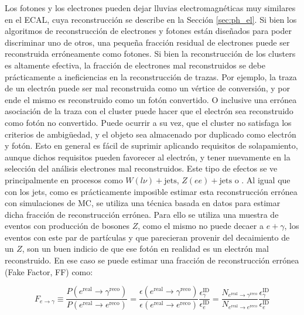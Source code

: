 Los fotones y los electrones pueden dejar lluvias electromagnéticas muy
similares en el ECAL, cuya reconstrucción se describe en la Sección \ref{sec:ph_el}.
Si bien los algoritmos de reconstrucción de electrones y fotones están diseñados para poder discriminar uno de otros, una pequeña fracción residual de electrones puede ser reconstruida erróneamente como fotones. Si bien la reconstrucción de los clusters es altamente efectiva, la fracción de electrones mal reconstruidos se debe prácticamente a ineficiencias en la reconstrucción de trazas. Por ejemplo, la traza de un electrón puede ser mal reconstruida como un vértice de conversión, y por ende el mismo es reconstruido como un fotón convertido. O inclusive una errónea asociación de la traza con el cluster puede hacer que el electrón sea reconstruido como fotón no convertido.
Puede ocurrir a su vez, que el cluster no satisfaga los criterios de ambigüedad, y el objeto sea almacenado por duplicado como electrón y fotón. Esto en general es fácil de suprimir aplicando requisitos de solapamiento, aunque dichos requisitos pueden favorecer al electrón, y tener nuevamente en la selección del análisis electrones mal reconstruidos. Este tipo de efectos se ve principalmente en procesos como $W(l\nu)+\text{jets}$, $Z(ee)+\text{jets}$ o \ttbar. Al igual que con los jets, como es prácticamente imposible estimar esta reconstrucción errónea con simulaciones de MC, se utiliza una técnica basada en datos para estimar dicha fracción de reconstrucción errónea. Para ello se utiliza una muestra de eventos con producción de bosones $Z$, como el mismo no puede decaer a $e+\gamma$, los eventos con este par de partículas y que parecieran provenir del decaimiento de un $Z$, son un buen indicio de que ese fotón en realidad es un electrón mal reconstruido. En ese caso se puede estimar una fracción de reconstrucción errónea (Fake Factor, FF) como:

\begin{equation}
  F_{e\to \gamma} \equiv \frac{P(e^{\text{real}}\to \gamma^{\text{reco}})}{P(e^{\text{real}}\to e^{\text{reco}})}  = \frac{\epsilon(e^{\text{real}}\to \gamma^{\text{reco}})}{\epsilon(e^{\text{real}}\to e^{\text{reco}})} \frac{\epsilon^{\text{ID}}_{\gamma}}{\epsilon^{\text{ID}}_{e}} = \frac{N_{e^{\text{real}}\to \gamma^{\text{reco}}}}{N_{e^{\text{real}}\to e^{\text{reco}}}} \frac{\epsilon^{\text{ID}}_{\gamma}}{\epsilon^{\text{ID}}_{e}}
  \label{eq:efake_ff}
\end{equation} 

